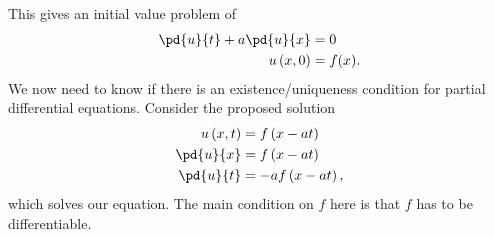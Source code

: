 \documentclass[10pt]{mypackage}
\begin{document}
This gives an initial value problem of
\begin{align*}
  \pd{u}{t} + a\pd{u}{x} &= 0\\
  u\left( x,0 \right) &= f(x).
\end{align*}
We now need to know if there is an existence/uniqueness condition for partial differential equations. Consider the proposed solution
\begin{align*}
  u\left( x,t \right) &= f\left( x-at \right)\\
  \pd{u}{x} &= f\left(x-at\right)\\
  \pd{u}{t} &= -af\left( x-at \right),
\end{align*}
which solves our equation. The main condition on $f$ here is that $f$ has to be differentiable.\newline
\end{document}
